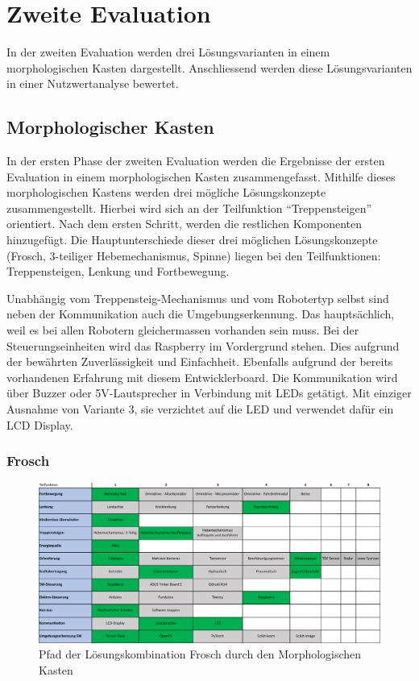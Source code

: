 \newpage
\section{Zweite Evaluation}
In der zweiten Evaluation werden drei Lösungsvarianten in einem morphologischen Kasten dargestellt. Anschliessend werden diese Lösungsvarianten in einer Nutzwertanalyse bewertet.
\subsection*{Morphologischer Kasten}
In der ersten Phase der zweiten Evaluation werden die Ergebnisse der ersten Evaluation in einem morphologischen Kasten zusammengefasst. Mithilfe dieses morphologischen Kastens werden drei mögliche Lösungskonzepte zusammengestellt. Hierbei wird sich an der Teilfunktion ``Treppensteigen'' orientiert. Nach dem ersten Schritt, werden die restlichen Komponenten hinzugefügt. Die Hauptunterschiede dieser drei möglichen Lösungskonzepte (Frosch, 3-teiliger Hebemechanismus, Spinne) liegen bei den Teilfunktionen: Treppensteigen, Lenkung und Fortbewegung.

Unabhängig vom Treppensteig-Mechanismus und vom Robotertyp selbst sind neben der Kommunikation auch die Umgebungserkennung. Das hauptsächlich, weil es bei allen Robotern gleichermassen vorhanden sein muss. Bei der Steuerungseinheiten wird das Raspberry im Vordergrund stehen. Dies aufgrund der bewährten Zuverlässigkeit und Einfachheit. Ebenfalls aufgrund der bereits vorhandenen Erfahrung mit diesem Entwicklerboard. Die Kommunikation wird über Buzzer oder 5V-Lautsprecher in Verbindung mit LEDs getätigt. Mit einziger Ausnahme von Variante 3, sie verzichtet auf die LED und verwendet dafür ein LCD Display.

\subsubsection*{Frosch}
\begin{figure}[h]
  \includegraphics[width=1.0\textwidth]{img/morphologische-kaesten/Morphologischer_Kasten_Frosch.png}
  \centering
  \caption{Pfad der Lösungskombination Frosch durch den Morphologischen Kasten}
  \label{fig:morphologischer-kasten-frosch}
\end{figure}
   
